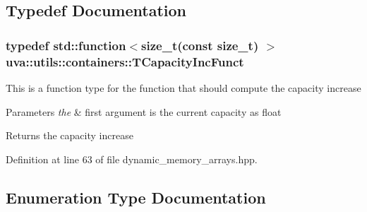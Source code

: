 \subsection{Typedef Documentation}
\hypertarget{namespaceuva_1_1utils_1_1containers_ab6acd1b6093503e17f6d8b942e9fccf1}{}
\subsubsection[{T\+Capacity\+Inc\+Funct}]{\setlength{\rightskip}{0pt plus 5cm}typedef std\+::function$<$size\+\_\+t(const size\+\_\+t) $>$ {\bf uva\+::utils\+::containers\+::\+T\+Capacity\+Inc\+Funct}}\label{namespaceuva_1_1utils_1_1containers_ab6acd1b6093503e17f6d8b942e9fccf1}
This is a function type for the function that should compute the capacity increase 
\begin{DoxyParams}{Parameters}
{\em the} & first argument is the current capacity as float \\
\hline
\end{DoxyParams}
\begin{DoxyReturn}{Returns}
the capacity increase 
\end{DoxyReturn}


Definition at line 63 of file dynamic\+\_\+memory\+\_\+arrays.\+hpp.



\subsection{Enumeration Type Documentation}
\hypertarget{namespaceuva_1_1utils_1_1containers_aea6a0a858974dd7edb4227dcbcbc1eb6}{}
